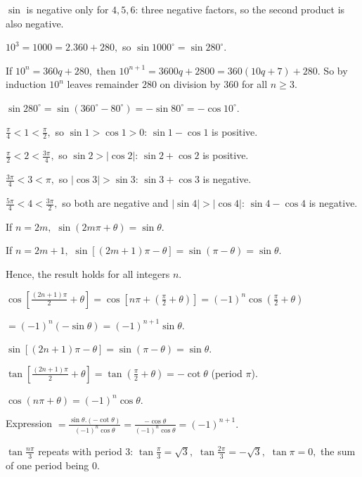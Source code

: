   $\sin$ is negative only for $4, 5, 6$: three negative factors, so the second product is also negative.

\item $10^3 = 1000 = 2.360 + 280,$ so $\sin 1000^\circ = \sin 280^\circ.$

  If $10^n = 360q + 280,$ then $10^{n + 1} = 3600q + 2800 = 360(10q + 7) + 280.$ So by induction $10^n$ leaves remainder $280$ on division by $360$ for
  all $n \geq 3.$

  $\sin 280^\circ = \sin(360^\circ - 80^\circ) = -\sin 80^\circ = -\cos 10^\circ.$

\item $\frac{\pi}{4} < 1 < \frac{\pi}{2},$ so $\sin 1 > \cos 1 > 0$: $\sin 1 - \cos 1$ is positive.

  $\frac{\pi}{2} < 2 < \frac{3\pi}{4},$ so $\sin 2 > |\cos 2|$: $\sin 2 + \cos 2$ is positive.

  $\frac{3\pi}{4} < 3 < \pi,$ so $|\cos 3| > \sin 3$: $\sin 3 + \cos 3$ is negative.

  $\frac{5\pi}{4} < 4 < \frac{3\pi}{2},$ so both are negative and $|\sin 4| > |\cos 4|$: $\sin 4 - \cos 4$ is negative.

\item If $n = 2m,$ $\sin(2m\pi + \theta) = \sin\theta.$

  If $n = 2m + 1,$ $\sin\left[(2m + 1)\pi - \theta\right] = \sin(\pi - \theta) = \sin\theta.$

  Hence, the result holds for all integers $n.$

\item $\cos\left[\frac{(2n + 1)\pi}{2} + \theta\right] = \cos\left[n\pi + \left(\frac{\pi}{2} + \theta\right)\right] =
  (-1)^n\cos\left(\frac{\pi}{2} + \theta\right)$

  $= (-1)^n(-\sin\theta) = (-1)^{n + 1}\sin\theta.$

\item $\sin\left[(2n + 1)\pi - \theta\right] = \sin(\pi - \theta) = \sin\theta.$

  $\tan\left[\frac{(2n + 1)\pi}{2} + \theta\right] = \tan\left(\frac{\pi}{2} + \theta\right) = -\cot\theta$ (period $\pi$).

  $\cos(n\pi + \theta) = (-1)^n\cos\theta.$

  Expression $= \frac{\sin\theta.(-\cot\theta)}{(-1)^n\cos\theta} = \frac{-\cos\theta}{(-1)^n\cos\theta} = (-1)^{n + 1}.$

\item $\tan\frac{n\pi}{3}$ repeats with period $3$: $\tan\frac{\pi}{3} = \sqrt{3},$ $\tan\frac{2\pi}{3} = -\sqrt{3},$ $\tan\pi =
  0,$ the sum of one period being $0.$

